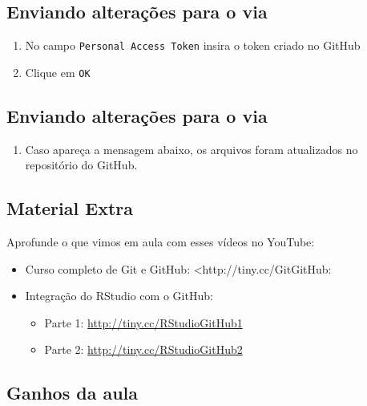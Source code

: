 \documentclass[
  letterpaper,
  DIV=11,
  numbers=noendperiod]{scrartcl}
\providecommand{\tightlist}{%
  \setlength{\itemsep}{0pt}\setlength{\parskip}{0pt}}
\begin{document}
\subsection{\texorpdfstring{Enviando alterações para o via
}{Enviando alterações para o  via }}\label{enviando-alterauxe7uxf5es-para-o-via-4}

\begin{enumerate}
\def\labelenumi{\arabic{enumi}.}
\setcounter{enumi}{8}
\item
  No campo \texttt{Personal\ Access\ Token} insira o token criado no
  GitHub
\item
  Clique em \texttt{OK}
\end{enumerate}

\subsection{\texorpdfstring{Enviando alterações para o via
}{Enviando alterações para o  via }}\label{enviando-alterauxe7uxf5es-para-o-via-5}

\begin{enumerate}
\def\labelenumi{\arabic{enumi}.}
\setcounter{enumi}{10}
\tightlist
\item
  Caso apareça a mensagem abaixo, os arquivos foram atualizados no
  repositório do GitHub.
\end{enumerate}

\subsection{Material Extra}\label{material-extra}

Aprofunde o que vimos em aula com esses vídeos no YouTube:

\begin{itemize}
\item
  Curso completo de Git e GitHub: \textless http://tiny.cc/GitGitHub:
\item
  Integração do RStudio com o GitHub:

  \begin{itemize}
  \tightlist
  \item
    Parte 1: \url{http://tiny.cc/RStudioGitHub1}
  \item
    Parte 2: \url{http://tiny.cc/RStudioGitHub2}
  \end{itemize}
\end{itemize}

\subsection{Ganhos da aula}\label{ganhos-da-aula}
\end{document}
